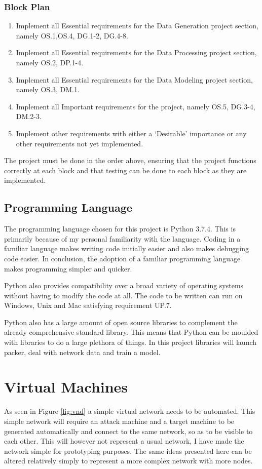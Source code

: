\subsubsection{Block Plan}
\begin{enumerate}[
    leftmargin=*,
    label={Block \arabic*.},
    ref={Block (\arabic*)}]
    \item Implement all Essential requirements for the Data Generation project section, namely OS.1,OS.4, DG.1-2, DG.4-8. 
    \item Implement all Essential requirements for the Data Processing project section, namely OS.2, DP.1-4. 
    \item Implement all Essential requirements for the Data Modeling project section, namely OS.3, DM.1.
    \item Implement all Important requirements for the project, namely OS.5, DG.3-4, DM.2-3.
    \item Implement other requirements with either a ‘Desirable’ importance or any other requirements not yet implemented.
\end{enumerate}

The project must be done in the order above, ensuring that the project functions correctly at each block and that testing can be done to each block as they are implemented.

\subsection{Programming Language}
The programming language chosen for this project is Python 3.7.4. This is primarily because of my personal familiarity with the language. Coding in a familiar language makes writing code initially easier and also makes debugging code easier. In conclusion, the adoption of a familiar programming language makes programming simpler and quicker.

Python also provides compatibility over a broad variety of operating systems without having to modify the code at all. The code to be written can run on Windows, Unix and Mac satisfying requirement UP.7.

Python also has a large amount of open source libraries to complement the already comprehensive standard library. This means that Python can be moulded with libraries to do a large plethora of things. In this project libraries will launch packer, deal with network data and train a model.

\section{Virtual Machines}
As seen in Figure \ref{fig:vnd} a simple virtual network needs to be automated. This simple network will require an attack machine and a target machine to be generated automatically and connect to the same network, so as to be visible to each other. This will however not represent a usual network, I have made the network simple for prototyping purposes. The same ideas presented here can be altered relatively simply to represent a more complex network with more nodes.

